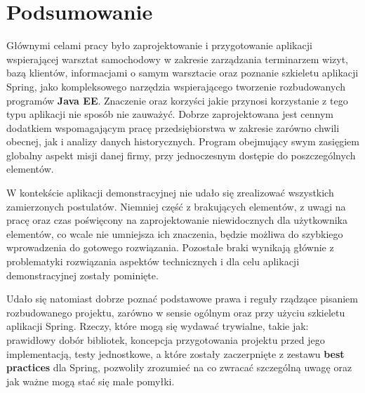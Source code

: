 \chapter{Podsumowanie}
\label{chapter:summary}
	Głównymi celami pracy było zaprojektowanie i przygotowanie aplikacji wspierającej warsztat samochodowy w zakresie
	zarządzania terminarzem wizyt, bazą klientów, informacjami o samym warsztacie oraz poznanie szkieletu aplikacji
	Spring, jako kompleksowego narzędzia wspierającego tworzenie rozbudowanych programów \textbf{Java EE}. 
	Znaczenie oraz korzyści jakie przynosi korzystanie z tego typu aplikacji nie sposób nie zauważyć. Dobrze zaprojektowana
	jest cennym dodatkiem wspomagającym pracę przedsiębiorstwa w zakresie zarówno chwili obecnej, jak i analizy danych historycznych.
	Program obejmujący swym zasięgiem globalny aspekt misji danej firmy, przy jednoczesnym dostępie do poszczególnych elementów. 
	
	W kontekście aplikacji demonstracyjnej nie udało się zrealizować wszystkich zamierzonych postulatów. Niemniej część z brakujących
	elementów, z uwagi na pracę oraz czas poświęcony na zaprojektowanie niewidocznych dla użytkownika elementów, co wcale nie umniejsza
	ich znaczenia, będzie możliwa do szybkiego wprowadzenia do gotowego rozwiązania. Pozostałe braki wynikają głównie z problematyki
	rozwiązania aspektów technicznych i dla celu aplikacji demonstracyjnej zostały pominięte.
	
	Udało się natomiast dobrze poznać podstawowe prawa i reguły rządzące pisaniem rozbudowanego projektu, zarówno w sensie ogólnym
	oraz przy użyciu szkieletu aplikacji Spring. Rzeczy, które mogą się wydawać trywialne, takie jak: prawidłowy dobór bibliotek, koncepcja przygotowania projektu przed jego implementacją,
	testy jednostkowe, a które zostały zaczerpnięte z zestawu \textbf{best practices} dla Spring, pozwoliły zrozumieć na co zwracać szczególną
	uwagę oraz jak ważne mogą stać się małe pomyłki. 